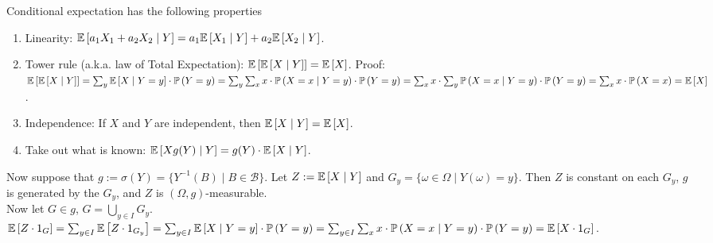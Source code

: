 \documentclass[english, course]{Notes}
\begin{document}
Conditional expectation has the following properties
\begin{enumerate}
	\item Linearity: $\mathbb{E}\left[a_1X_1 + a_2X_2 \mid Y\right] = a_1 \mathbb{E}\left[X_1 \mid Y\right] + a_2 \mathbb{E}\left[X_2 \mid Y\right]$.
	\item Tower rule (a.k.a. law of Total Expectation): $\mathbb{E}\left[\mathbb{E}\left[X \mid Y\right]\right] = \mathbb{E}\left[X\right]$. Proof: $\mathbb{E}\left[\mathbb{E}\left[X \mid Y\right]\right] = \sum_y \mathbb{E}\left[X \mid Y = y\right] \cdot \mathbb{P}\left(Y = y\right) = \sum_y \sum_x x \cdot \mathbb{P}\left(X = x \mid Y = y\right) \cdot \mathbb{P}\left(Y = y\right) = \sum_x x \cdot \sum_y \mathbb{P}\left(X = x \mid Y = y\right) \cdot \mathbb{P}\left(Y = y\right) = \sum_x x \cdot \mathbb{P}\left(X = x\right) = \mathbb{E}\left[X\right]$.
	\item Independence: If $X$ and $Y$ are independent, then $\mathbb{E}\left[X \mid Y\right] = \mathbb{E}\left[X\right]$.
	\item Take out what is known: $\mathbb{E}\left[X g(Y) \mid Y\right] = g(Y) \cdot \mathbb{E}\left[X \mid Y\right]$.
\end{enumerate}

Now suppose that $g :=  \sigma(Y) = \{Y^{-1}(B) \mid B \in \mathcal{B}\}$. Let $Z:= \mathbb{E}\left[X \mid Y\right]$ and $G_y = \{\omega \in \Omega \mid Y(\omega) = y\}$. Then $Z$ is constant on each $G_y$, $g$ is generated by the $G_y$, and $Z$ is $(\Omega, g)$-measurable. \\

Now let $G \in g$, $G = \bigcup_{y \in I}G_y$. $\mathbb{E}\left[Z \cdot 1_G\right] = \sum_{y \in I} \mathbb{E}\left[Z \cdot 1_{G_y}\right] = \sum_{y \in I} \mathbb{E}\left[X \mid Y = y\right] \cdot \mathbb{P}\left(Y = y\right) = \sum_{y \in I} \sum_x x \cdot \mathbb{P}\left(X = x \mid Y = y\right) \cdot \mathbb{P}\left(Y = y\right) = \mathbb{E}\left[X \cdot 1_G\right]$.
\end{document}
